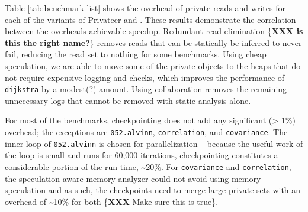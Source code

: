 Table \ref{tab:benchmark-list} shows the overhead of private reads and
writes for each of the variants of Privateer and \namensp. These results
demonstrate the correlation between the overheads achievable speedup.
Redundant read elimination \{\textbf{XXX is this the right
name?}\} removes reads that can be statically be inferred to never fail,
reducing the read set to nothing for some benchmarks.
Using cheap speculation, we are able to move some of the private objects to
the heaps that do not require expensive logging and checks, which improves
the performance of \texttt{dijkstra} by a modest(?) amount.
Using collaboration removes the remaining unnecessary logs that cannot
be removed with static analysis alone.

For most of the benchmarks, checkpointing does not add any
significant (> 1\%) overhead; the exceptions are
\texttt{052.alvinn}, \texttt{correlation}, and \texttt{covariance}.
The inner loop of \texttt{052.alvinn} is chosen for parallelization --
because the useful work of the loop is small and runs for 60,000
iterations, checkpointing constitutes a considerable portion of the run
time, \textasciitilde20\%. For \texttt{covariance} and \texttt{correlation},
the speculation-aware memory analyzer could not avoid using memory
speculation and as such, the checkpoints need to merge large private sets
with an overhead of \textasciitilde10\% for both \{\textbf{XXX} Make sure
this is true\}.

